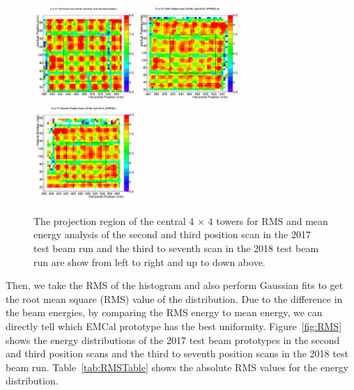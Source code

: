 \documentclass[hidelinks,11pt]{article}
\numberwithin{figure}{section}
\numberwithin{table}{section}
\begin{document}
\begin{figure}[hbtp]
\begin{center}
\includegraphics[width=0.34\textwidth]{Plots/2018/5th/ProjectionRange.png}
\includegraphics[width=0.34\textwidth]{Plots/2018/6th/ProjectionRange.png}
\includegraphics[width=0.34\textwidth]{Plots/2018/7th/ProjectionRange.png}
\caption{The projection region of the central 4 $\times$ 4 towers for RMS and mean energy analysis of the second and third position scan in the 2017 test beam run and the third to seventh scan in the 2018 test beam run are show from left to right and up to down above.}
\label{fig:TowerProj}
\end{center}
\end{figure} 


Then, we take the RMS of the histogram and also perform Gaussian fits to get the root mean square (RMS) value of the distribution. Due to the difference in the beam energies, by comparing the RMS energy to mean energy, we can directly tell which EMCal prototype has the best uniformity. Figure~\ref{fig:RMS} shows the energy distributions of the 2017 test beam prototypes in the second and third position scans and the third to seventh position scans in the 2018 test beam run. Table~\ref{tab:RMSTable} shows the absolute RMS values for the energy distribution.
\end{document}
